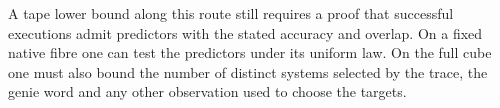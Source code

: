 A tape lower bound along this route still requires a proof that
successful executions admit predictors with the stated accuracy and
overlap. On a fixed native fibre one can test the predictors under its
uniform law. On the full cube one must also bound the number of distinct
systems selected by the trace, the genie word and any other observation
used to choose the targets.
